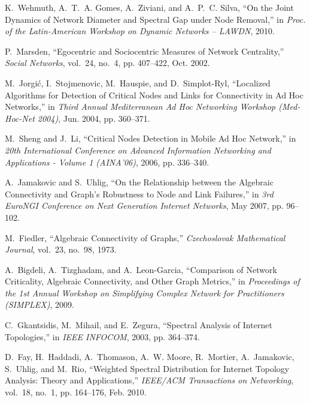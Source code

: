 \documentclass[conference,fleqn]{IEEEtran}
\begin{document}
\begin{thebibliography}{10}
K.~Wehmuth, A.~T.~A. Gomes, A.~Ziviani, and A.~P.~C. Silva, ``{On the Joint
  Dynamics of Network Diameter and Spectral Gap under Node Removal},'' in
  \emph{Proc. of the Latin-American Workshop on Dynamic Networks -- LAWDN},
  2010.

P.~Marsden, ``{Egocentric and Sociocentric Measures of Network Centrality},''
  \emph{Social Networks}, vol.~24, no.~4, pp. 407--422, Oct. 2002.

M.~Jorgi\'{c}, I.~Stojmenovic, M.~Hauspie, and D.~Simplot-Ryl, ``{Localized
  Algorithms for Detection of Critical Nodes and Links for Connectivity in Ad
  Hoc Networks},'' in \emph{Third Annual Mediterranean Ad Hoc Networking
  Workshop (Med-Hoc-Net 2004)}, Jun. 2004, pp. 360--371.

M.~Sheng and J.~Li, ``{Critical Nodes Detection in Mobile Ad Hoc Network},'' in
  \emph{20th International Conference on Advanced Information Networking and
  Applications - Volume 1 (AINA'06)}, 2006, pp. 336--340.

A.~Jamakovic and S.~Uhlig, ``{On the Relationship between the Algebraic
  Connectivity and Graph's Robustness to Node and Link Failures},'' in
  \emph{3rd EuroNGI Conference on Next Generation Internet Networks}, May 2007,
  pp. 96--102.

M.~Fiedler, ``{Algebraic Connectivity of Graphs},'' \emph{Czechoslovak
  Mathematical Journal}, vol.~23, no.~98, 1973.

A.~Bigdeli, A.~Tizghadam, and A.~Leon-Garcia, ``{Comparison of Network
  Criticality, Algebraic Connectivity, and Other Graph Metrics},'' in
  \emph{Proceedings of the 1st Annual Workshop on Simplifying Complex Network
  for Practitioners (SIMPLEX)}, 2009.

C.~Gkantsidis, M.~Mihail, and E.~Zegura, ``{Spectral Analysis of Internet
  Topologies},'' in \emph{IEEE INFOCOM}, 2003, pp. 364--374.

D.~Fay, H.~Haddadi, A.~Thomason, A.~W. Moore, R.~Mortier, A.~Jamakovic,
  S.~Uhlig, and M.~Rio, ``{Weighted Spectral Distribution for Internet Topology
  Analysis: Theory and Applications},'' \emph{IEEE/ACM Transactions on
  Networking}, vol.~18, no.~1, pp. 164--176, Feb. 2010.

\end{thebibliography}
\end{document}
